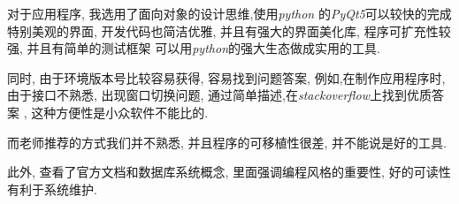 \documentclass{myreport}
\begin{document}
    对于应用程序, 我选用了面向对象的设计思维,使用\emph{python}
    的\emph{PyQt5}可以较快的完成特别美观的界面,
    开发代码也简洁优雅, 并且有强大的界面美化库,
    程序可扩充性较强,
    并且有简单的测试框架
    可以用\emph{python}的强大生态做成实用的工具.

    同时, 由于环境版本号比较容易获得, 容易找到问题答案,
    例如,在制作应用程序时, 由于接口不熟悉,
    出现窗口切换问题,
    通过简单描述,在\emph{stackoverflow}上找到优质答案
    ,
    这种方便性是小众软件不能比的.

    而老师推荐的方式我们并不熟悉,
    并且程序的可移植性很差,
    并不能说是好的工具.

    此外, 查看了官方文档和数据库系统概念,
    里面强调编程风格的重要性,
    好的可读性有利于系统维护.

\nocite{pipvenv}
\nocite{ali_icon}

\end{document}
